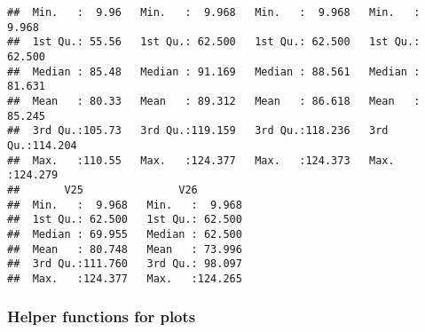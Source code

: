 \documentclass[
]{article}
\begin{document}
\begin{verbatim}
##  Min.   :  9.96   Min.   :  9.968   Min.   :  9.968   Min.   :  9.968  
##  1st Qu.: 55.56   1st Qu.: 62.500   1st Qu.: 62.500   1st Qu.: 62.500  
##  Median : 85.48   Median : 91.169   Median : 88.561   Median : 81.631  
##  Mean   : 80.33   Mean   : 89.312   Mean   : 86.618   Mean   : 85.245  
##  3rd Qu.:105.73   3rd Qu.:119.159   3rd Qu.:118.236   3rd Qu.:114.204  
##  Max.   :110.55   Max.   :124.377   Max.   :124.373   Max.   :124.279  
##       V25               V26         
##  Min.   :  9.968   Min.   :  9.968  
##  1st Qu.: 62.500   1st Qu.: 62.500  
##  Median : 69.955   Median : 62.500  
##  Mean   : 80.748   Mean   : 73.996  
##  3rd Qu.:111.760   3rd Qu.: 98.097  
##  Max.   :124.377   Max.   :124.265
\end{verbatim}

\subsubsection{Helper functions for
plots}\label{helper-functions-for-plots}
\end{document}
